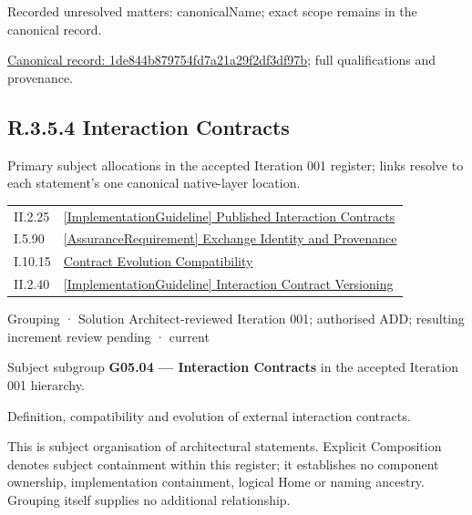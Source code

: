 {\small Recorded unresolved matters: canonicalName; exact scope remains in the canonical record.}\par
{\footnotesize \href{../../../../continuum/grouping/1de844b879754fd7a21a29f2df3df97b.md}{Canonical record: 1de844b879754fd7a21a29f2df3df97b}; full qualifications and provenance.}\par
\subsection*{R.3.5.4 Interaction Contracts}
\label{navigation:R.3.5.4}

Primary subject allocations in the accepted Iteration 001 register; links resolve to each statement’s one canonical native-layer location.\par
\begin{longtable}{p{.22\linewidth}p{.73\linewidth}}
II.2.25 & \hyperref[element:b21633d8a1554688baf8704264c63608]{[ImplementationGuideline] Published Interaction Contracts} \\
I.5.90 & \hyperref[element:5579b7ce9df540359b7ba36f807b52c5]{[AssuranceRequirement] Exchange Identity and Provenance} \\
I.10.15 & \hyperref[element:0da415a142c640d9ab1c73d770df8ea3]{Contract Evolution Compatibility} \\
II.2.40 & \hyperref[element:71d7a55f3d8c4b12836601da142cb304]{[ImplementationGuideline] Interaction Contract Versioning} \\
\end{longtable}
\label{element:b3c19413e4b447adb5f1d86912db4052}
{\small Grouping · Solution Architect-reviewed Iteration 001; authorised ADD; resulting increment review pending · current}\par

Subject subgroup \textbf{G05.04 — Interaction Contracts} in the accepted Iteration 001 hierarchy.



Definition, compatibility and evolution of external interaction contracts.



This is subject organisation of architectural statements. Explicit Composition denotes subject containment within this register; it establishes no component ownership, implementation containment, logical Home or naming ancestry. Grouping itself supplies no additional relationship.


